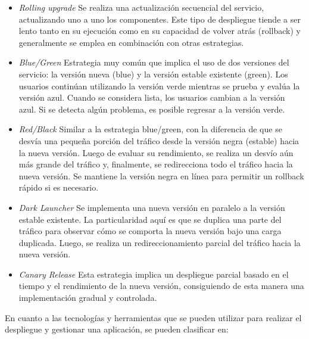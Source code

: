 \begin{itemize}
    \item \textit{Rolling upgrade}
    \newline
    Se realiza una actualización secuencial del servicio, actualizando uno a uno los componentes. Este tipo de despliegue 
    tiende a ser lento tanto en su ejecución como en su capacidad de volver atrás (rollback) y generalmente se emplea en 
    combinación con otras estrategias.

    \item \textit{Blue/Green}
    \newline
    Estrategia muy común que implica el uso de dos versiones del servicio: la versión nueva (blue) y la versión estable 
    existente (green). Los usuarios continúan utilizando la versión verde mientras se prueba y evalúa la versión azul. Cuando se considera lista, los usuarios cambian a la versión azul. Si se detecta algún problema, es posible regresar a la versión verde.

    \item \textit{ Red/Black}
    \newline
    Similar a la estrategia blue/green, con la diferencia de que se desvía una pequeña porción del tráfico desde la 
    versión negra (estable) hacia la nueva versión. Luego de evaluar su rendimiento, se realiza un desvío aún más grande 
    del tráfico y, finalmente, se redirecciona todo el tráfico hacia la nueva versión. Se mantiene la versión negra en 
    línea para permitir un rollback rápido si es necesario.

    \item \textit{Dark Launcher}
    \newline
    Se implementa una nueva versión en paralelo a la versión estable existente. La particularidad aquí es que se duplica 
    una parte del tráfico para observar cómo se comporta la nueva versión bajo una carga duplicada. Luego, se realiza un 
    redireccionamiento parcial del tráfico hacia la nueva versión.

    \item \textit{Canary Release}
    \newline
    Esta estrategia implica un despliegue parcial basado en el tiempo y el rendimiento de la nueva versión, consiguiendo
    de esta manera una implementación gradual y controlada.
\end{itemize}

En cuanto a las tecnologías y herramientas que se pueden utilizar para realizar el despliegue y gestionar una aplicación,
se pueden clasificar en:

